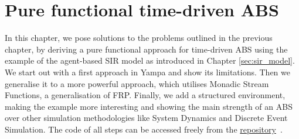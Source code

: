 \chapter{Pure functional time-driven ABS}
\label{ch:timedriven}

In this chapter, we pose solutions to the problems outlined in the previous chapter, by deriving a pure functional approach for time-driven ABS using the example of the agent-based SIR model as introduced in Chapter \ref{sec:sir_model}. We start out with a first approach in Yampa and show its limitations. Then we generalise it to a more powerful approach, which utilises Monadic Stream Functions, a generalisation of FRP. Finally, we add a structured environment, making the example more interesting and showing the main strength of an ABS over other simulation methodologies like System Dynamics and Discrete Event Simulation. The code of all steps can be accessed freely from the \href{https://github.com/thalerjonathan/haskell-sir}{repository}~\cite{thaler_sir_repository}.







